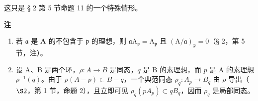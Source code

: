 这只是 § 2 第 5 节命题 11 的一个特殊情形。

\textbf{注}\par

\begin{enumerate}
\def\labelenumi{(\arabic{enumi})}
\setcounter{enumi}{2}
\item
  若 \(\mathfrak{a}\) 是 \(\mathbf{A}\) 的不包含于 \(\mathfrak{p}\) 的理想，则 \(\mathfrak{a}\mathrm{A}_{\mathfrak{p}} = \mathrm{A}_{\mathfrak{p}}\) 且 \((\mathrm{A} / \mathfrak{a})_{\mathfrak{p}} = 0\)（§ 2，第 5 节，注）。
\item
  设 A、B 是两个环，\(\rho: A \to B\) 是同态，\(q\) 是 B 的素理想，而 \(p\) 是 A 的素理想 \(\rho^{-1}(q)\)。由于 \(\rho(A - p) \subset B - q\)，一个典范同态 \(\rho_q: A_p \to B_q\) 由 \(\rho\) 导出（\(\S 2\)，第 1 节，命题 2），且立即可见 \(\rho_q(pA_p) \subset qB_q\)，因而 \(\rho_q\) 是局部同态。
\end{enumerate}
